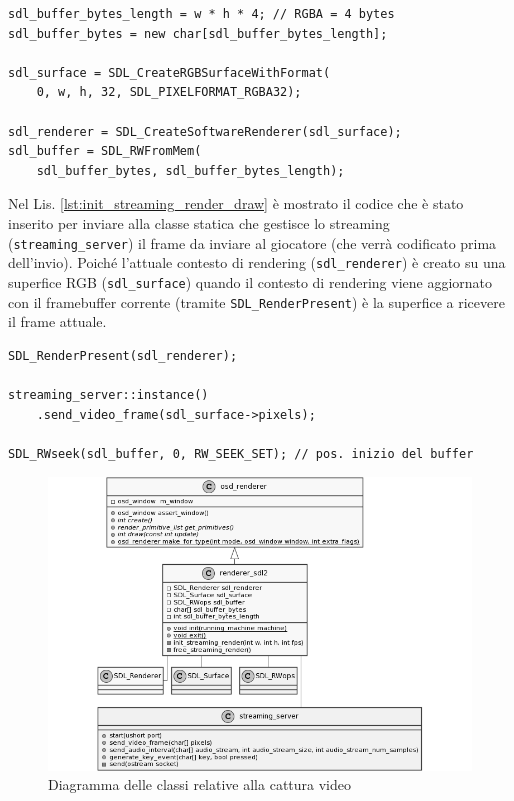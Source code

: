 \begin{lstlisting}[caption=Codice aggiunto per la cattura video: inizializzazione, label={lst:init_streaming_render_init}]
sdl_buffer_bytes_length = w * h * 4; // RGBA = 4 bytes
sdl_buffer_bytes = new char[sdl_buffer_bytes_length];

sdl_surface = SDL_CreateRGBSurfaceWithFormat(
	0, w, h, 32, SDL_PIXELFORMAT_RGBA32);

sdl_renderer = SDL_CreateSoftwareRenderer(sdl_surface);	
sdl_buffer = SDL_RWFromMem(
	sdl_buffer_bytes, sdl_buffer_bytes_length);
\end{lstlisting}

Nel Lis. \ref{lst:init_streaming_render_draw} è mostrato il codice che è stato inserito per inviare alla classe statica che gestisce lo streaming (\verb|streaming_server|) il frame da inviare al giocatore (che verrà codificato prima dell'invio). Poiché l'attuale contesto di rendering (\verb|sdl_renderer|) è creato su una superfice RGB (\verb|sdl_surface|) quando il contesto di rendering viene aggiornato con il framebuffer corrente (tramite \verb|SDL_RenderPresent|) è la superfice a ricevere il frame attuale.

\begin{lstlisting}[caption=Codice aggiunto per la cattura video: disegno, label={lst:init_streaming_render_draw}]
SDL_RenderPresent(sdl_renderer);

streaming_server::instance()
	.send_video_frame(sdl_surface->pixels);

SDL_RWseek(sdl_buffer, 0, RW_SEEK_SET); // pos. inizio del buffer
\end{lstlisting}

\begin{figure}[H]
	\includegraphics[width=\linewidth]{immagini/class_renderingSDLFull_Streaming}
	\caption{Diagramma delle classi relative alla cattura video}
	\label{fig:class_renderingSDLFull_Streaming}
\end{figure}



